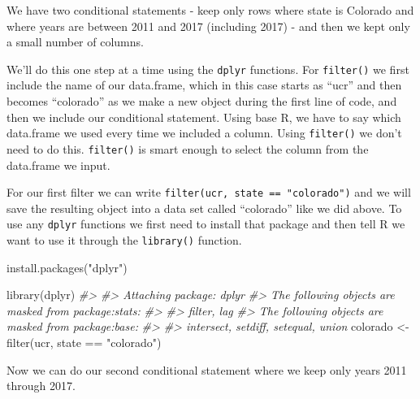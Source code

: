 \documentclass[
]{krantz}
\makeatletter
\newenvironment{Shaded}{\begin{snugshade}}{\end{snugshade}}
\newcommand{\CommentTok}[1]{\textcolor[rgb]{0.37,0.37,0.37}{\textit{#1}}}
\newcommand{\FunctionTok}[1]{\textcolor[rgb]{0,0,0}{#1}}
\newcommand{\NormalTok}[1]{#1}
\newcommand{\OtherTok}[1]{\textcolor[rgb]{0.37,0.37,0.37}{#1}}
\newcommand{\SpecialCharTok}[1]{\textcolor[rgb]{0,0,0}{#1}}
\newcommand{\StringTok}[1]{\textcolor[rgb]{0.5,0.5,0.5}{#1}}
\newenvironment{kframe}{%
\medskip{}
\setlength{\fboxsep}{.8em}
 \def\at@end@of@kframe{}%
 \ifinner\ifhmode%
  \def\at@end@of@kframe{\end{minipage}}%
  \begin{minipage}{\columnwidth}%
 \fi\fi%
 \def\FrameCommand##1{\hskip\@totalleftmargin \hskip-\fboxsep
 \colorbox{shadecolor}{##1}\hskip-\fboxsep
     \hskip-\linewidth \hskip-\@totalleftmargin \hskip\columnwidth}%
 \MakeFramed {\advance\hsize-\width
   \@totalleftmargin\z@ \linewidth\hsize
   \@setminipage}}%
 {\par\unskip\endMakeFramed%
 \at@end@of@kframe}
\renewenvironment{Shaded}{\begin{kframe}}{\end{kframe}}
\makeatother
\begin{document}
We have two conditional statements - keep only rows where state is Colorado and where years are between 2011 and 2017 (including 2017) - and then we kept only a small number of columns.

We'll do this one step at a time using the \texttt{dplyr} functions. For \texttt{filter()} we first include the name of our data.frame, which in this case starts as ``ucr'' and then becomes ``colorado'' as we make a new object during the first line of code, and then we include our conditional statement. Using base R, we have to say which data.frame we used every time we included a column. Using \texttt{filter()} we don't need to do this. \texttt{filter()} is smart enough to select the column from the data.frame we input.

For our first filter we can write \texttt{filter(ucr,\ state\ ==\ "colorado")} and we will save the resulting object into a data set called ``colorado'' like we did above. To use any \texttt{dplyr} functions we first need to install that package and then tell R we want to use it through the \texttt{library()} function.

\begin{Shaded}
\begin{Highlighting}[]
\FunctionTok{install.packages}\NormalTok{(}\StringTok{"dplyr"}\NormalTok{)}
\end{Highlighting}
\end{Shaded}

\begin{Shaded}
\begin{Highlighting}[]
\FunctionTok{library}\NormalTok{(dplyr)}
\CommentTok{\#\textgreater{} }
\CommentTok{\#\textgreater{} Attaching package: \textquotesingle{}dplyr\textquotesingle{}}
\CommentTok{\#\textgreater{} The following objects are masked from \textquotesingle{}package:stats\textquotesingle{}:}
\CommentTok{\#\textgreater{} }
\CommentTok{\#\textgreater{}     filter, lag}
\CommentTok{\#\textgreater{} The following objects are masked from \textquotesingle{}package:base\textquotesingle{}:}
\CommentTok{\#\textgreater{} }
\CommentTok{\#\textgreater{}     intersect, setdiff, setequal, union}
\NormalTok{colorado }\OtherTok{\textless{}{-}} \FunctionTok{filter}\NormalTok{(ucr, state }\SpecialCharTok{==} \StringTok{"colorado"}\NormalTok{)}
\end{Highlighting}
\end{Shaded}

Now we can do our second conditional statement where we keep only years 2011 through 2017.
\end{document}
